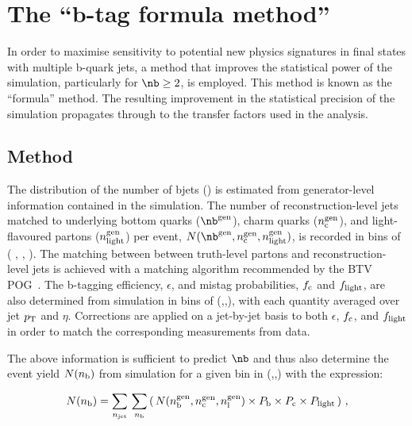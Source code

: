 \section{The ``b-tag formula method''\label{sec:bjets}}

In order to maximise sensitivity to potential new physics signatures
in final states with multiple b-quark jets, a method that improves the
statistical power of the simulation, particularly for $\nb \geq 2$, is
employed. This method is known as the ``formula'' method. The
resulting improvement in the statistical precision of the simulation
propagates through to the transfer factors used in the analysis.

\subsection{Method}

The distribution of the number of bjets (\nb) is estimated from generator-level information
contained in the simulation. The number of reconstruction-level jets
matched to underlying bottom quarks ($\nb^{\rm gen}$), charm quarks
($n_{\rm c}^{\rm gen}$), and light-flavoured partons ($n_{\rm
  light}^{\rm gen}$) per event, $N(\nb^{\rm gen},n_{\rm c}^{\rm
  gen},n_{\rm light}^{\rm gen})$, is recorded in bins of (\njet
   , \scalht, \mht). 
 The matching between between truth-level partons
and reconstruction-level jets is achieved with a matching algorithm
recommended by the BTV POG~\cite{btagMCTools}.
 The b-tagging efficiency, $\epsilon$, and mistag probabilities,
$f_{\rm c}$ and $f_{\rm light}$, are also determined from simulation
in bins of (\njet,\scalht,\mht), with each quantity averaged
over jet $p_{\rm T}$ and $\eta$. Corrections are applied on a
jet-by-jet basis to both $\epsilon$, $f_{\rm c}$, and $f_{\rm light}$
in order to match the corresponding measurements from
data.%

The above information is sufficient to predict $\nb$ and thus also
determine the event yield $N(n_{\rm b})$ from simulation for a given
bin in (\njet,\scalht,\mht) with the expression:

\begin{equation}
  \label{equ:btag-formula}
  N(n_{\textrm{b}}) = \sum_{n_{\textrm{jet}}} \, \sum_{n_{\textrm{b}}}
  \left( \, N(n_{\textrm{b}}^{\textrm{gen}},
    n_{\textrm{c}}^{\textrm{gen}}, n_{\textrm{l}}^{\textrm{gen}})
    \times P_{\rm b} \times P_{\rm c} \times P_{\rm light} \, \right) \, , 
\end{equation}

